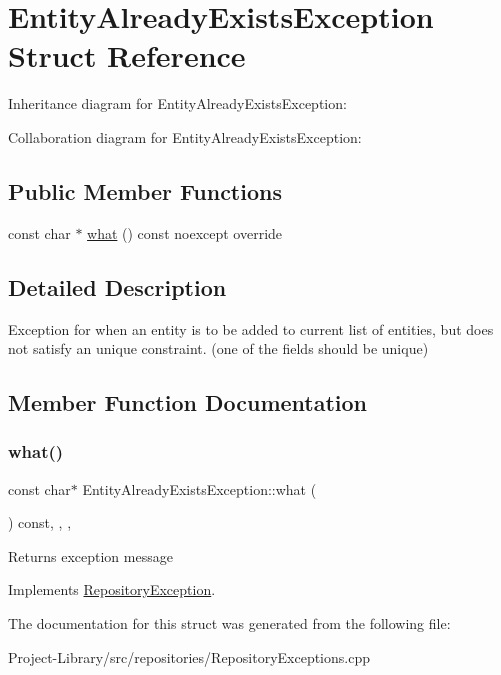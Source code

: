 \hypertarget{structEntityAlreadyExistsException}{}\section{Entity\+Already\+Exists\+Exception Struct Reference}
\label{structEntityAlreadyExistsException}


Inheritance diagram for Entity\+Already\+Exists\+Exception\+:


Collaboration diagram for Entity\+Already\+Exists\+Exception\+:
\subsection*{Public Member Functions}
\begin{DoxyCompactItemize}
\item 
const char $\ast$ \hyperlink{structEntityAlreadyExistsException_a820d866ae427ee0dccaf839a196e27b5}{what} () const noexcept override
\end{DoxyCompactItemize}


\subsection{Detailed Description}
Exception for when an entity is to be added to current list of entities, but does not satisfy an unique constraint. (one of the fields should be unique) 

\subsection{Member Function Documentation}
\mbox{\label{structEntityAlreadyExistsException_a820d866ae427ee0dccaf839a196e27b5}} 
\subsubsection{\texorpdfstring{what()}{what()}}
{\footnotesize\ttfamily const char$\ast$ Entity\+Already\+Exists\+Exception\+::what (\begin{DoxyParamCaption}{ }\end{DoxyParamCaption}) const\hspace{0.3cm}{\ttfamily [inline]}, {\ttfamily [override]}, {\ttfamily [virtual]}, {\ttfamily [noexcept]}}

Returns exception message 

Implements \hyperlink{structRepositoryException_a6fdc5fe8fe6abdd205402d8648e5ccd4}{Repository\+Exception}.



The documentation for this struct was generated from the following file\+:\begin{DoxyCompactItemize}
\item 
Project-\/\+Library/src/repositories/Repository\+Exceptions.\+cpp\end{DoxyCompactItemize}
